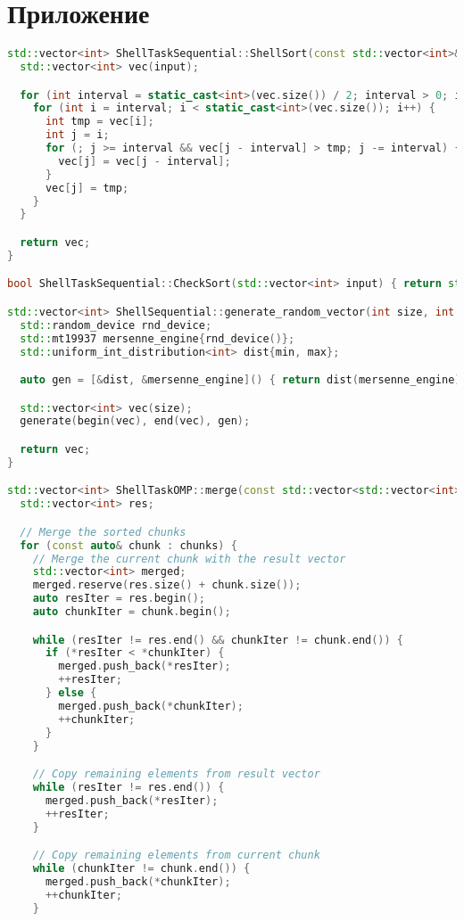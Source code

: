 \documentclass[]{article}
\theoremstyle{remark}
\theoremstyle{definition}
\begin{document}
\newpage

\section{Приложение}

\begin{lstlisting}[language=C++]
std::vector<int> ShellTaskSequential::ShellSort(const std::vector<int>& input) {
  std::vector<int> vec(input);

  for (int interval = static_cast<int>(vec.size()) / 2; interval > 0; interval /= 2) {
    for (int i = interval; i < static_cast<int>(vec.size()); i++) {
      int tmp = vec[i];
      int j = i;
      for (; j >= interval && vec[j - interval] > tmp; j -= interval) {
        vec[j] = vec[j - interval];
      }
      vec[j] = tmp;
    }
  }

  return vec;
}

bool ShellTaskSequential::CheckSort(std::vector<int> input) { return std::is_sorted(input.begin(), input.end()); }

std::vector<int> ShellSequential::generate_random_vector(int size, int min, int max) {
  std::random_device rnd_device;
  std::mt19937 mersenne_engine{rnd_device()};
  std::uniform_int_distribution<int> dist{min, max};

  auto gen = [&dist, &mersenne_engine]() { return dist(mersenne_engine); };

  std::vector<int> vec(size);
  generate(begin(vec), end(vec), gen);

  return vec;
}

std::vector<int> ShellTaskOMP::merge(const std::vector<std::vector<int>>& chunks) {
  std::vector<int> res;

  // Merge the sorted chunks
  for (const auto& chunk : chunks) {
    // Merge the current chunk with the result vector
    std::vector<int> merged;
    merged.reserve(res.size() + chunk.size());
    auto resIter = res.begin();
    auto chunkIter = chunk.begin();

    while (resIter != res.end() && chunkIter != chunk.end()) {
      if (*resIter < *chunkIter) {
        merged.push_back(*resIter);
        ++resIter;
      } else {
        merged.push_back(*chunkIter);
        ++chunkIter;
      }
    }

    // Copy remaining elements from result vector
    while (resIter != res.end()) {
      merged.push_back(*resIter);
      ++resIter;
    }

    // Copy remaining elements from current chunk
    while (chunkIter != chunk.end()) {
      merged.push_back(*chunkIter);
      ++chunkIter;
    }


\end{lstlisting}
\end{document}
